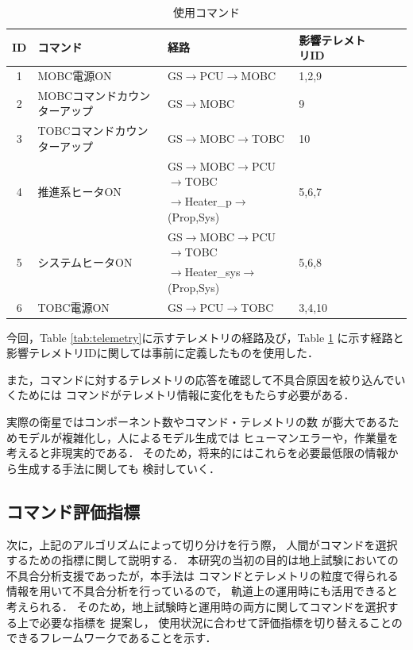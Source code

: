 \documentclass[11pt]{article}
\begin{document}
\begin{table}[H]
   \centering
   \caption{使用コマンド}
   \label{tab:command}
      \begin{tabular}{clllccc} \hline
         ID&コマンド&経路&影響テレメトリID\\ \hline
         1&MOBC電源ON&GS$\rightarrow$PCU$\rightarrow$MOBC&1,2,9\\
         2&MOBCコマンドカウンターアップ&GS$\rightarrow$MOBC&9\\
         3&TOBCコマンドカウンターアップ&GS$\rightarrow$MOBC$\rightarrow$TOBC&10\\
         \multirow{2}{*}{4}&\multirow{2}{*}{推進系ヒータON}&GS$\rightarrow$MOBC$\rightarrow$PCU$\rightarrow$TOBC&\multirow{2}{*}{5,6,7}\\
         &&$\rightarrow$Heater\_p$\rightarrow$(Prop,Sys)&\\
         \multirow{2}{*}{5}&\multirow{2}{*}{システムヒータON}&GS$\rightarrow$MOBC$\rightarrow$PCU$\rightarrow$TOBC&\multirow{2}{*}{5,6,8}\\
         &&$\rightarrow$Heater\_sys$\rightarrow$(Prop,Sys)&\\
         6&TOBC電源ON&GS$\rightarrow$PCU$\rightarrow$TOBC&3,4,10\\ \hline
      \end{tabular}
\end{table}

今回，Table \ref{tab:telemetry}に示すテレメトリの経路及び，Table \ref{tab:command}
に示す経路と影響テレメトリIDに関しては事前に定義したものを使用した．

また，コマンドに対するテレメトリの応答を確認して不具合原因を絞り込んでいくためには
コマンドがテレメトリ情報に変化をもたらす必要がある．

\cite{}

実際の衛星ではコンポーネント数やコマンド・テレメトリの数
が膨大であるためモデルが複雑化し，人によるモデル生成では
ヒューマンエラーや，作業量を考えると非現実的である．
そのため，将来的にはこれらを必要最低限の情報から生成する手法に関しても
検討していく．

\subsection{コマンド評価指標}
次に，上記のアルゴリズムによって切り分けを行う際，
人間がコマンドを選択するための指標に関して説明する．
本研究の当初の目的は地上試験においての不具合分析支援であったが，本手法は
コマンドとテレメトリの粒度で得られる情報を用いて不具合分析を行っているので，
軌道上の運用時にも活用できると考えられる．
そのため，地上試験時と運用時の両方に関してコマンドを選択する上で必要な指標を
提案し，
使用状況に合わせて評価指標を切り替えることのできるフレームワークであることを示す．
\end{document}
